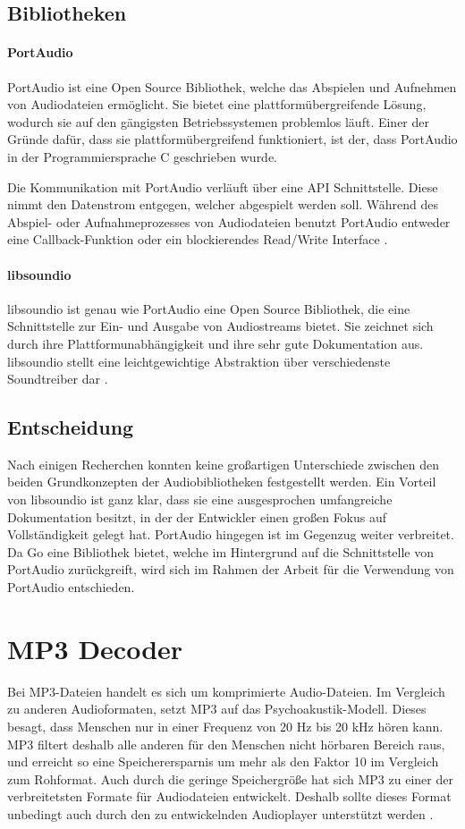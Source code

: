 \subsection{Bibliotheken}
\paragraph{PortAudio}
PortAudio ist eine Open Source Bibliothek, welche das Abspielen und Aufnehmen
von Audiodateien ermöglicht. Sie bietet eine plattformübergreifende Lösung,
wodurch sie auf den gängigsten Betriebssystemen problemlos läuft. Einer der
Gründe dafür, dass sie plattformübergreifend funktioniert, ist der, dass
PortAudio in der Programmiersprache C geschrieben wurde. \hfill

Die Kommunikation mit PortAudio verläuft über eine \ac{API} Schnittstelle.
Diese nimmt den Datenstrom entgegen, welcher abgespielt werden soll. Während
des Abspiel- oder Aufnahmeprozesses von Audiodateien benutzt PortAudio entweder
eine Callback-Funktion oder ein blockierendes Read/Write Interface
\autocite{PortAudio_2019}.

\paragraph{libsoundio}
libsoundio ist genau wie PortAudio eine Open Source Bibliothek, die eine
Schnittstelle zur Ein- und Ausgabe von Audiostreams bietet. Sie zeichnet
sich durch ihre Plattformunabhängigkeit und ihre sehr gute Dokumentation aus.
libsoundio stellt eine leichtgewichtige Abstraktion über verschiedenste
Soundtreiber dar \autocite{libsoundio_2019}.

\subsection{Entscheidung}
Nach einigen Recherchen konnten keine großartigen Unterschiede zwischen den
beiden Grundkonzepten der Audiobibliotheken festgestellt werden. Ein Vorteil von
libsoundio ist ganz klar, dass sie eine ausgesprochen umfangreiche
Dokumentation besitzt, in der der Entwickler einen großen Fokus auf
Vollständigkeit gelegt hat. PortAudio hingegen ist im Gegenzug weiter verbreitet.
Da Go eine Bibliothek bietet, welche im Hintergrund auf die Schnittstelle
von PortAudio zurückgreift, wird sich im Rahmen der Arbeit für die
Verwendung von PortAudio entschieden.

\section{\acs{MP3} Decoder}
Bei \ac{MP3}-Dateien handelt es sich um komprimierte Audio-Dateien. Im
Vergleich zu anderen Audioformaten, setzt \ac{MP3} auf das
Psychoakustik-Modell. Dieses besagt, dass Menschen nur in einer Frequenz von 20
Hz bis 20 kHz hören kann. \ac{MP3} filtert deshalb alle anderen für den
Menschen nicht hörbaren Bereich raus, und erreicht so eine Speicherersparnis um
mehr als den Faktor 10 im Vergleich zum Rohformat. Auch durch die geringe
Speichergröße hat sich \ac{MP3} zu einer der verbreitetsten Formate für
Audiodateien entwickelt.  Deshalb sollte dieses Format unbedingt auch durch den
zu entwickelnden Audioplayer unterstützt werden \autocite{mp3}. \hfill

